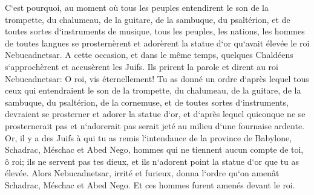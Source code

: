 \verse C`est pourquoi, au moment où tous les peuples entendirent le son de la trompette, du chalumeau, de la guitare, de la sambuque, du psaltérion, et de toutes sortes d`instruments de musique, tous les peuples, les nations, les hommes de toutes langues se prosternèrent et adorèrent la statue d`or qu`avait élevée le roi Nebucadnetsar. 
\verse A cette occasion, et dans le même temps, quelques Chaldéens s`approchèrent et accusèrent les Juifs. 
\verse Ils prirent la parole et dirent au roi Nebucadnetsar: O roi, vis éternellement! 
\verse Tu as donné un ordre d`après lequel tous ceux qui entendraient le son de la trompette, du chalumeau, de la guitare, de la sambuque, du psaltérion, de la cornemuse, et de toutes sortes d`instruments, devraient se prosterner et adorer la statue d`or, 
\verse et d`après lequel quiconque ne se prosternerait pas et n`adorerait pas serait jeté au milieu d`une fournaise ardente. 
\verse Or, il y a des Juifs à qui tu as remis l`intendance de la province de Babylone, Schadrac, Méschac et Abed Nego, hommes qui ne tiennent aucun compte de toi, ô roi; ils ne servent pas tes dieux, et ils n`adorent point la statue d`or que tu as élevée. 
\verse Alors Nebucadnetsar, irrité et furieux, donna l`ordre qu`on amenât Schadrac, Méschac et Abed Nego. Et ces hommes furent amenés devant le roi. 
